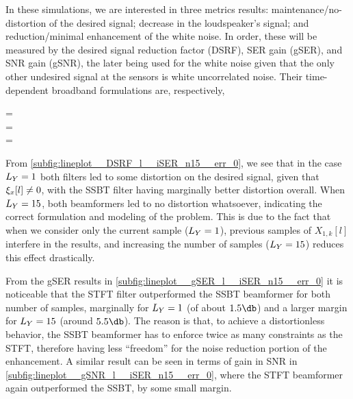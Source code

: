 In these simulations, we are interested in three metrics results: maintenance/no-distortion of the desired signal; decrease in the loudspeaker's signal; and reduction/minimal enhancement of the white noise. In order, these will be measured by the desired signal reduction factor (DSRF), SER gain (gSER), and SNR gain (gSNR), the later being used for the white noise given that the only other undesired signal at the sensors is white uncorrelated noise. Their time-dependent broadband formulations are, respectively,
\begin{subgather}
	\dsrf[l] =  \\
	\gser[l] =  \cdot {} \\
	\gsnr[l] =  \cdot {}
\end{subgather}

From \cref{subfig:lineplot__DSRF_l__iSER_n15__err_0}, we see that in the case $\Ly = 1$ both filters led to some distortion on the desired signal, given that $\xi_{x}[l] \neq 0$, with the SSBT filter having marginally better distortion overall. When $\Ly = 15$, both beamformers led to no distortion whatsoever, indicating the correct formulation and modeling of the problem. This is due to the fact that when we consider only the current sample ($\Ly = 1$), previous samples of $X_{1,k}[l]$ interfere in the results, and increasing the number of samples ($\Ly = 15$) reduces this effect drastically.

From the gSER results in \cref{subfig:lineplot__gSER_l__iSER_n15__err_0} it is noticeable that the STFT filter outperformed the SSBT beamformer for both number of samples, marginally for $\Ly = 1$ (of about $1.5\dB$) and a larger margin for $\Ly = 15$ (around $5.5 \dB$). The reason is that, to achieve a distortionless behavior, the SSBT beamformer has to enforce twice as many constraints as the STFT, therefore having less ``freedom'' for the noise reduction portion of the enhancement. A similar result can be seen in terms of gain in SNR in \cref{subfig:lineplot__gSNR_l__iSER_n15__err_0}, where the STFT beamformer again outperformed the SSBT, by some small margin.



